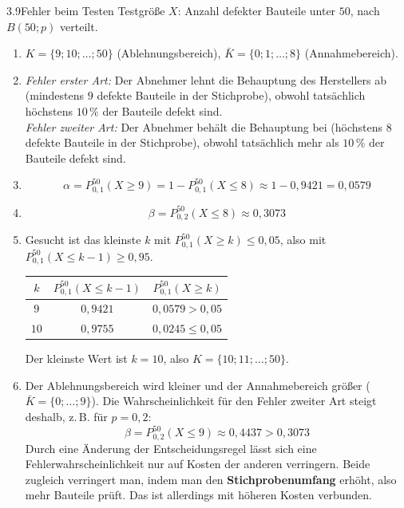 
\begin{loesung}{3.9}{Fehler beim Testen}
Testgröße $X$: Anzahl defekter Bauteile unter $50$, nach $B(50;p)$ verteilt.
\begin{enumerate}[label=\alph*)]
  \item $K = \{9;10;\ldots;50\}$ (Ablehnungsbereich), $\bar{K} = \{0;1;\ldots;8\}$ (Annahmebereich).
  \item \textit{Fehler erster Art:} Der Abnehmer lehnt die Behauptung des Herstellers ab (mindestens $9$ defekte Bauteile in der Stichprobe), obwohl tatsächlich höchstens $10\,\%$ der Bauteile defekt sind.\\
  \textit{Fehler zweiter Art:} Der Abnehmer behält die Behauptung bei (höchstens $8$ defekte Bauteile in der Stichprobe), obwohl tatsächlich mehr als $10\,\%$ der Bauteile defekt sind.
  \item \[\alpha = P^{50}_{0{,}1}(X\geq 9) = 1-P^{50}_{0{,}1}(X\leq 8)\approx 1-0{,}9421 = 0{,}0579\]
  \item \[\beta = P^{50}_{0{,}2}(X\leq 8)\approx 0{,}3073\]
  \item Gesucht ist das kleinste $k$ mit $P^{50}_{0{,}1}(X\geq k)\leq 0{,}05$, also mit $P^{50}_{0{,}1}(X\leq k-1)\geq 0{,}95$.
  \begin{center}\begin{tabular}{|c|c|c|}
    \hline
    $k$ & $P^{50}_{0{,}1}(X\leq k-1)$ & $P^{50}_{0{,}1}(X\geq k)$\\
    \hline
    $9$ & $0{,}9421$ & $0{,}0579 > 0{,}05$\\
    \hline
    $10$ & $0{,}9755$ & $0{,}0245\leq 0{,}05$\\
    \hline
  \end{tabular}\end{center}
  Der kleinste Wert ist $k=10$, also $K = \{10;11;\ldots;50\}$.
  \item Der Ablehnungsbereich wird kleiner und der Annahmebereich größer ($\bar{K} = \{0;\ldots;9\}$). Die Wahrscheinlichkeit für den Fehler zweiter Art steigt deshalb, z.\,B. für $p=0{,}2$:
  \[\beta = P^{50}_{0{,}2}(X\leq 9)\approx 0{,}4437 > 0{,}3073\]
  Durch eine Änderung der Entscheidungsregel lässt sich eine Fehlerwahrscheinlichkeit nur auf Kosten der anderen verringern. Beide zugleich verringert man, indem man den \textbf{Stichprobenumfang} erhöht, also mehr Bauteile prüft. Das ist allerdings mit höheren Kosten verbunden.
\end{enumerate}
\end{loesung}

